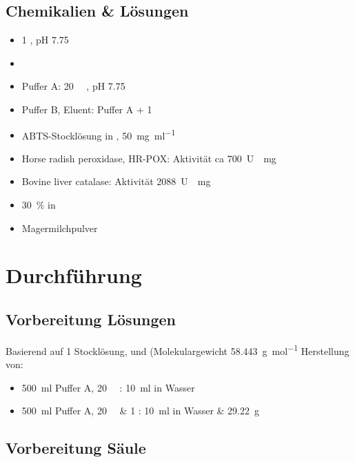 \documentclass[a4paper,german]{scrreprt}
\begin{document}
\section{Chemikalien \& Lösungen}

\begin{itemize}
	\item  \SI{1}{\Molar} , pH 7.75
	\item {}
	\item Puffer A: \SI{20}{\milli\Molar} , pH 7.75
	\item Puffer B, Eluent: Puffer A + \SI{1}{\Molar} 
	\item ABTS-Stocklösung in , \SI{50}{\milli\gram \per \milli\litre}
	\item Horse radish peroxidase, HR-POX: Aktivität ca \SI{700}{U \per \milli\gram}
	\item Bovine liver catalase: Aktivität \SI{2088}{U \per \milli\gram}
	\item {} \SI{30}{\percent} in 
	\item Magermilchpulver
\end{itemize}

\cite{skriptv9}

\chapter{Durchführung}

\section{Vorbereitung Lösungen}

Basierend auf \SI{1}{\Molar}  Stocklösung, und 
(Molekulargewicht \SI{58.443}{\gram\per mol} Herstellung von:
\begin{itemize}
	\item \SI{500}{ml} Puffer A, \SI{20}{\milli\Molar} : \SI{10}{\ml}  in Wasser
	\item \SI{500}{ml} Puffer A, \SI{20}{\milli\Molar}  \& \SI{1}{\Molar} : \SI{10}{\ml}  in Wasser \& \SI{29.22}{\g} 
\end{itemize}

\section{Vorbereitung Säule}
\end{document}
